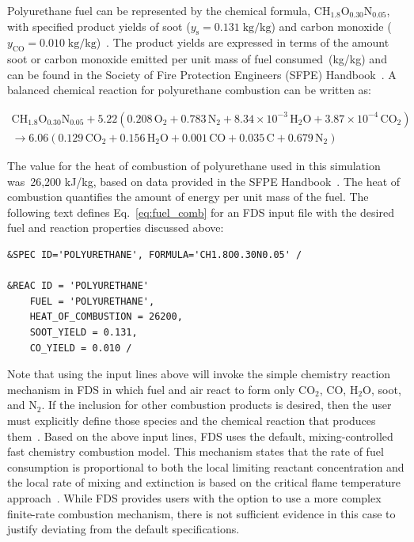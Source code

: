 \documentclass[12pt,oneside]{book}
\renewcommand{\C}{\mbox{C}}
\renewcommand{\H}{\mbox{H}}
\renewcommand{\O}{\mbox{O}}
\newcommand{\N}{\mbox{N}}
\begin{document}
Polyurethane fuel can be represented by the chemical formula, $\C\H_{1.8}\O_{0.30}\N_{0.05}$, with specified product yields of soot ($y_{\mathrm{s}}=0.131 \; \mathrm{kg}/\mathrm{kg}$) and carbon monoxide ($y_{\mathrm{CO}}=0.010 \; \mathrm{kg}/\mathrm{kg}$)~\cite{SFPE:Tewarson}. The product yields are expressed in terms of the amount soot or carbon monoxide emitted per unit mass of fuel consumed~(kg/kg) and can be found in the Society of Fire Protection Engineers (SFPE) Handbook~\cite{SFPE:Tewarson}. A balanced chemical reaction for polyurethane combustion can be written as:

\begin{multline}
\C\H_{1.8}\O_{0.30}\N_{0.05} + 5.22(0.208\,\O_{2} + 0.783\,\N_{2} + 8.34 \times 10^{-3}\,\H_{2}\O + 3.87 \times 10^{-4}\,\C\O_{2}) \\
\rightarrow 6.06(0.129\,\C\O_{2} + 0.156\,\H_{2}\O + 0.001\,\C\O + 0.035\,\C + 0.679\,\N_{2})
\label{eq:fuel_comb}
\end{multline}

The value for the heat of combustion of polyurethane used in this simulation was~26,200 kJ/kg, based on data provided in the SFPE Handbook~\cite{SFPE:Tewarson}. The heat of combustion quantifies the amount of energy per unit mass of the fuel. The following text defines Eq.~\ref{eq:fuel_comb} for an FDS input file with the desired fuel and reaction properties discussed above:

\begin{lstlisting}
&SPEC ID='POLYURETHANE', FORMULA='CH1.8O0.30N0.05' /

&REAC ID = 'POLYURETHANE' 
    FUEL = 'POLYURETHANE', 
    HEAT_OF_COMBUSTION = 26200,
    SOOT_YIELD = 0.131,
    CO_YIELD = 0.010 /
\end{lstlisting}

Note that using the input lines above will invoke the simple chemistry reaction mechanism in FDS in which fuel and air react to form only CO$_2$, CO, H$_2$O, soot, and N$_2$. If the inclusion for other combustion products is desired, then the user must explicitly define those species and the chemical reaction that produces them~\cite{FDS_Users_Guide}. Based on the above input lines, FDS uses the default, mixing-controlled fast chemistry combustion model. This mechanism states that the rate of fuel consumption is proportional to both the local limiting reactant concentration and the local rate of mixing and extinction is based on the critical flame temperature approach~\cite{FDS_Math_Guide}. While FDS provides users with the option to use a more complex finite-rate combustion mechanism, there is not sufficient evidence in this case to justify deviating from the default specifications.
\end{document}
